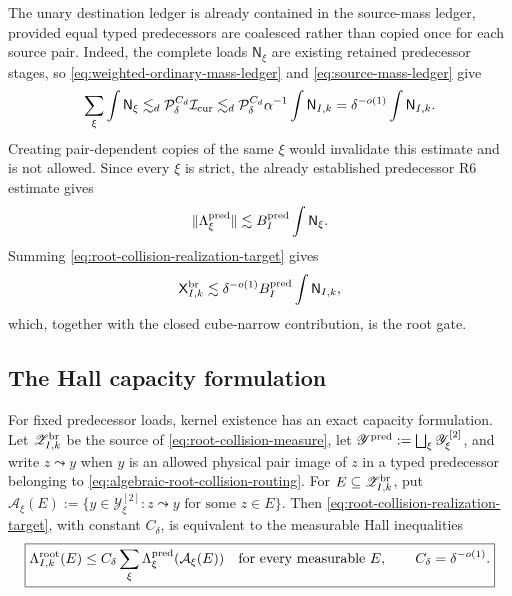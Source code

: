 \documentclass[11pt]{article}
\begin{document}
The unary destination ledger is already contained in the source-mass ledger,
provided equal typed predecessors are coalesced rather than copied once for
each source pair.  Indeed, the complete loads \(\mathsf N_\xi\) are existing
retained predecessor stages, so \eqref{eq:weighted-ordinary-mass-ledger} and
\eqref{eq:source-mass-ledger} give
\begin{equation}\label{eq:coalesced-predecessor-unary-ledger}
 \sum_\xi\int\mathsf N_\xi
 \lesssim_d
 \mathcal P_\delta^{C_d}\mathcal I_{\rm cur}
 \lesssim_d
 \mathcal P_\delta^{C_d}\alpha^{-1}
 \int\mathsf N_{I,k}
 =\delta^{-o(1)}\int\mathsf N_{I,k}.
\end{equation}
Creating pair-dependent copies of the same \(\xi\) would invalidate this
estimate and is not allowed.  Since
every \(\xi\) is strict, the already established predecessor R6 estimate gives
\[
 \|\Lambda_\xi^{\rm pred}\|
 \lesssim B_I^{\rm pred}\int\mathsf N_\xi.
\]
Summing \eqref{eq:root-collision-realization-target} gives
\[
 \mathsf X^{\rm br}_{I,k}
 \lesssim\delta^{-o(1)}B_I^{\rm pred}
          \int\mathsf N_{I,k},
\]
which, together with the closed cube-narrow contribution, is the root gate.


\subsection{The Hall capacity formulation}

For fixed predecessor loads, kernel existence has an exact capacity
formulation.  Let \(\mathscr Z^{\rm br}_{I,k}\) be the source of
\eqref{eq:root-collision-measure}, let
\(\mathscr Y^{\rm pred}:=\bigsqcup_\xi\mathscr Y_\xi^{[2]}\), and write
\(z\leadsto y\) when \(y\) is an allowed physical pair image of \(z\) in a
typed predecessor belonging to
\eqref{eq:algebraic-root-collision-routing}.  For
\(E\subseteq\mathscr Z^{\rm br}_{I,k}\), put
\(\mathcal A_\xi(E):=\{y\in\mathscr Y_\xi^{[2]}:
z\leadsto y\text{ for some }z\in E\}\).  Then
\eqref{eq:root-collision-realization-target}, with constant \(C_\delta\), is
equivalent to the measurable Hall inequalities
\begin{equation}\label{eq:pair-routing-hall-cut}
 \boxed{
 \Lambda^{\rm root}_{I,k}(E)
 \le C_\delta\sum_\xi
       \Lambda_\xi^{\rm pred}(\mathcal A_\xi(E))
 \quad\text{for every measurable }E,
 \qquad C_\delta=\delta^{-o(1)}.}
\end{equation}
\end{document}
